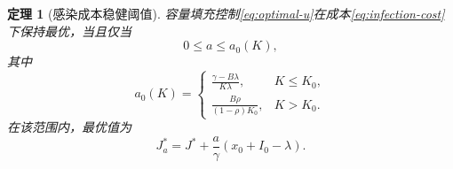 \documentclass[11pt,a4paper,UTF8]{ctexart}
\newtheorem{theorem}{定理}[section]
\theoremstyle{definition}
\begin{document}
\begin{theorem}[感染成本稳健阈值]
容量填充控制\eqref{eq:optimal-u}在成本\eqref{eq:infection-cost}下保持最优，当且仅当
\begin{equation}
0\le a\le a_0(K),
\label{eq:a-range}
\end{equation}
其中
\begin{equation}
 a_0(K)=
\begin{cases}
\displaystyle\frac{\gamma-B\lambda}{K\lambda}, & K\le K_0,\\[3mm]
\displaystyle\frac{B\rho}{(1-\rho)K_0}, & K>K_0.
\end{cases}
\label{eq:a0}
\end{equation}
在该范围内，最优值为
\begin{equation}
J_a^*=J^*+\frac{a}{\gamma}(x_0+I_0-\lambda).
\label{eq:Ja-star}
\end{equation}
\end{theorem}
\end{document}
